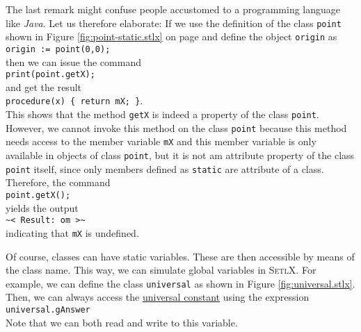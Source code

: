 The last remark might confuse people accustomed to a programming language like \textsl{Java}.  Let
us therefore elaborate: If we use the definition of the class \texttt{point} shown in Figure
\ref{fig:point-static.stlx} on page \pageref{fig:point-static.stlx} and define the object
\texttt{origin} as
\\[0.2cm]
\hspace*{1.3cm}
\texttt{origin := point(0,0);}
\\[0.2cm]
then we can issue the command
\\[0.2cm]
\hspace*{1.3cm}
\texttt{print(point.getX);}
\\[0.2cm]
and get the result
\\[0.2cm]
\hspace*{1.3cm}
\texttt{procedure(x) \{ return mX; \}}.
\\[0.2cm]
This shows that the method \texttt{getX} is indeed a property of the class \texttt{point}.  However, 
we cannot invoke this method on the class \texttt{point} because this method needs access to the
member variable \texttt{mX} and this member variable is only available in objects of class
\texttt{point}, but it is not am attribute property of the class \texttt{point} itself, since only members
defined as \texttt{static} are attribute of a class.  Therefore, the command
\\[0.2cm]
\hspace*{1.3cm}
\texttt{point.getX();}
\\[0.2cm]
yields the output
\\[0.2cm]
\hspace*{1.3cm}
\texttt{\~{}< Result: om >\~}
\\[0.2cm]
indicating that \texttt{mX} is undefined.  

Of course, classes can have static variables.  These are
then accessible by means  of the class name.  This way, we can simulate global variables in
\textsc{SetlX}.  For example, we can define the class \texttt{universal} as shown in Figure
\ref{fig:universal.stlx}.  Then, we can always access the 
\href{http://en.wikipedia.org/wiki/Answer_to_the_Ultimate_Question_of_Life,_the_Universe,_and_Everything#Answer_to_the_Ultimate_Question_of_Life.2C_the_Universe_and_Everything_.2842.29}{universal constant}
 using the expression
\\[0.2cm]
\hspace*{1.3cm}
\texttt{universal.gAnswer}
\\[0.2cm]
Note that we can both read and write to this variable.

